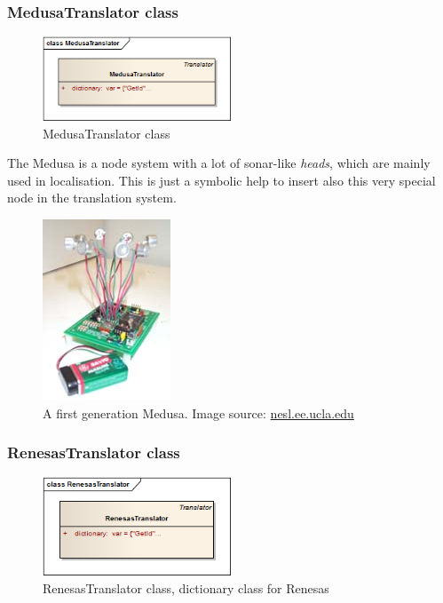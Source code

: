 \subsubsection{MedusaTranslator class}
\begin{figure}[H]
   \centering
   \includegraphics[width=0.5\textwidth]{pic/MedusaTranslator.png}%
   \caption{MedusaTranslator class}
   \label{MedusaTranslatorpic}%
\end{figure}

The Medusa is a node system with a lot of sonar-like \textit{heads}, which are mainly used in localisation.\cite{Dispert}
This is just a symbolic help to insert also this very special node in the translation system.

\begin{figure}[H]
   \centering
   \includegraphics{pic/medusa.jpg}%
   \caption{A first generation Medusa. Image source: \url{nesl.ee.ucla.edu}}
   \label{Medusapic}%
\end{figure}


\subsubsection{RenesasTranslator class}
\begin{figure}[H]
   \centering
   \includegraphics[width=0.5\textwidth]{pic/RenesasTranslator.png}%
   \caption{RenesasTranslator class, dictionary class for Renesas}
   \label{RenesasTranslatorpic}%
\end{figure}

